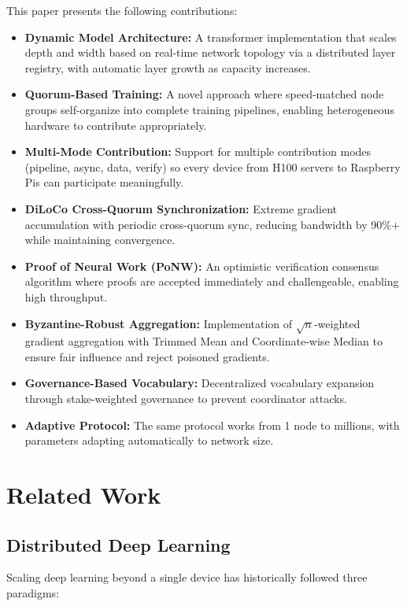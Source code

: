 \documentclass[11pt,a4paper]{article}
\begin{document}
This paper presents the following contributions:

\begin{itemize}
    \item \textbf{Dynamic Model Architecture:} A transformer implementation that scales depth and width based on real-time network topology via a distributed layer registry, with automatic layer growth as capacity increases.
    \item \textbf{Quorum-Based Training:} A novel approach where speed-matched node groups self-organize into complete training pipelines, enabling heterogeneous hardware to contribute appropriately.
    \item \textbf{Multi-Mode Contribution:} Support for multiple contribution modes (pipeline, async, data, verify) so every device from H100 servers to Raspberry Pis can participate meaningfully.
    \item \textbf{DiLoCo Cross-Quorum Synchronization:} Extreme gradient accumulation with periodic cross-quorum sync, reducing bandwidth by 90\%+ while maintaining convergence.
    \item \textbf{Proof of Neural Work (PoNW):} An optimistic verification consensus algorithm where proofs are accepted immediately and challengeable, enabling high throughput.
    \item \textbf{Byzantine-Robust Aggregation:} Implementation of $\sqrt{n}$-weighted gradient aggregation with Trimmed Mean and Coordinate-wise Median to ensure fair influence and reject poisoned gradients.
    \item \textbf{Governance-Based Vocabulary:} Decentralized vocabulary expansion through stake-weighted governance to prevent coordinator attacks.
    \item \textbf{Adaptive Protocol:} The same protocol works from 1 node to millions, with parameters adapting automatically to network size.
\end{itemize}

\section{Related Work}

\subsection{Distributed Deep Learning}

Scaling deep learning beyond a single device has historically followed three paradigms:
\end{document}
